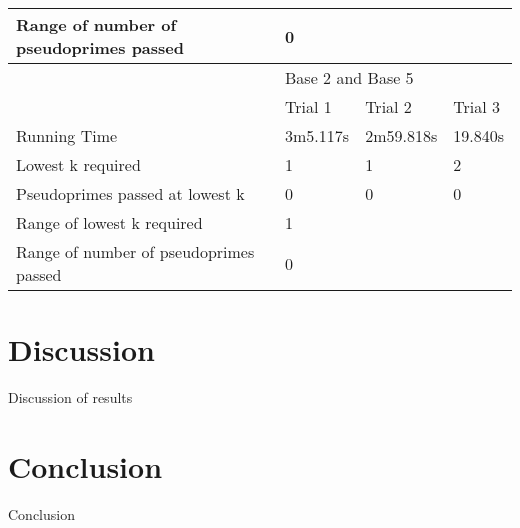 \documentclass{article}
\begin{document}
\begin{table}[h]
\begin{tabular}{@{}llll@{}}
Range of number of pseudoprimes passed & \multicolumn{3}{l}{0}                 \\\midrule
                                       & \multicolumn{3}{l}{Base 2 and Base 5} \\\midrule
                                       & Trial 1     & Trial 2    & Trial 3    \\
Running Time                           & 3m5.117s    & 2m59.818s  & 19.840s    \\ %
Lowest k required                      & 1           & 1          & 2          \\
Pseudoprimes passed at lowest k        & 0           & 0          & 0          \\
Range of lowest k required             & \multicolumn{3}{l}{1}                 \\
Range of number of pseudoprimes passed & \multicolumn{3}{l}{0}                 \\ \bottomrule
\end{tabular}
\end{table}
\label{table:euler}
\FloatBarrier

\section{Discussion}
Discussion of results

\section{Conclusion}
Conclusion

\nocite{*}


\end{document}
